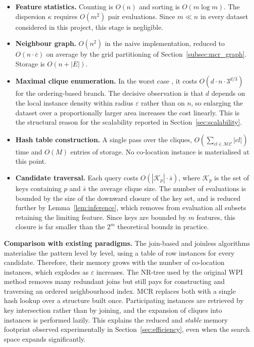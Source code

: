 \documentclass[12pt, letterpaper]{template}
\theoremstyle{definition}
\begin{document}
\begin{itemize}
    \item \textbf{Feature statistics.} Counting is $O(n)$ and sorting is $O(m \log m)$. The
    dispersion $\kappa$ requires $O(m^2)$ pair evaluations. Since $m \ll n$ in every dataset
    considered in this project, this stage is negligible.

    \item \textbf{Neighbour graph.} $O(n^2)$ in the naive implementation, reduced to
    $O(n \cdot \bar{c})$ on average by the grid partitioning of
    Section~\ref{subsec:mcr_graph}. Storage is $O(n + |E|)$.

    \item \textbf{Maximal clique enumeration.} In the worst case , it costs $O(d \cdot n \cdot 3^{d/3})$ for the
    ordering-based branch. The decisive observation is that $d$ depends on the local instance
    density within radius $\varepsilon$ rather than on $n$, so enlarging the dataset over a
    proportionally larger area increases the cost linearly. This is the structural
    reason for the scalability reported in Section~\ref{sec:scalability}.

    \item \textbf{Hash table construction.} A single pass over the cliques, $O(\sum_{cl \in \mathcal{MC}} |cl|)$
    time and $O(M)$ entries of storage. No co-location instance is materialised at this point.

    \item \textbf{Candidate traversal.} Each query costs $O(|\mathcal{K}_p| \cdot \bar{s})$,
    where $\mathcal{K}_p$ is the set of keys containing $p$ and $\bar{s}$ the average clique size. The number of evaluations is bounded by the
    size of the downward closure of the key set, and is reduced further by
    Lemma~\ref{lem:inference}, which removes from evaluation all subsets retaining the
    limiting feature. Since keys are bounded by $m$ features, this closure is far smaller than
    the $2^m$ theoretical boundz in practice.
\end{itemize}

\noindent\textbf{Comparison with existing paradigms.}
The join-based and joinless algorithms materialise the pattern level by level, using a table of row instances
for every candidate. Therefore, their memory grows with the number of co-location instances, which
explodes as $\varepsilon$ increases. The NR-tree used by the original WPI method removes many
redundant joins but still pays for constructing and traversing an ordered neighbourhood
index. MCR replaces both with a single hash lookup over a structure built once. Participating
instances are retrieved by key intersection rather than by joining, and the expansion of
cliques into instances is performed lazily. This explains the reduced and \emph{stable} memory footprint observed experimentally in
Section~\ref{sec:efficiency}, even when the search space expands significantly.
\end{document}
